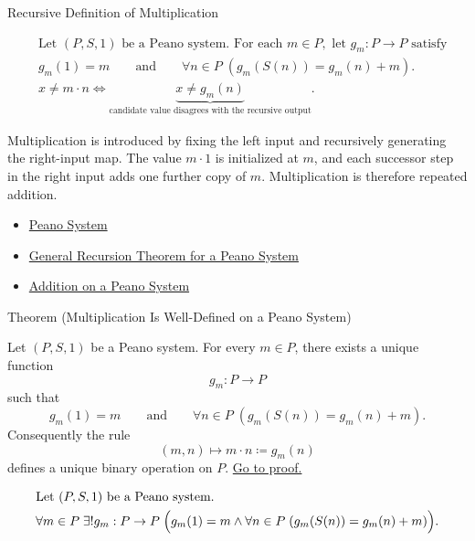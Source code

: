 \begin{topicbox}{Recursive Definition of Multiplication}
\begin{remark*}
\[
\begin{aligned}
&\text{Let } (P,S,1) \text{ be a Peano system. For each } m \in P,
\text{ let } g_m : P \to P \text{ satisfy}\\
&g_m(1)=m
\qquad\text{and}\qquad
\forall n \in P\;(g_m(S(n))=g_m(n)+m).\\
&x \neq m \cdot n
\Longleftrightarrow
\underbrace{x \neq g_m(n)}_{\text{candidate value disagrees with the recursive output}}.
\end{aligned}
\]
\end{remark*}

\begin{remark*}[Interpretation]
Multiplication is introduced by fixing the left input and recursively
generating the right-input map. The value $m \cdot 1$ is initialized at $m$,
and each successor step in the right input adds one further copy of $m$.
Multiplication is therefore repeated addition.
\end{remark*}

\begin{dependencies}
\begin{itemize}
  \item \hyperref[def:peano-system]{Peano System}
  \item \hyperref[thm:general-recursion-theorem-for-peano-system]{General Recursion Theorem for a Peano System}
  \item \hyperref[def:addition-on-peano-system]{Addition on a Peano System}
\end{itemize}
\end{dependencies}

\begin{theorembox}{Theorem (Multiplication Is Well-Defined on a Peano System)}
\begin{theorem}
\label{thm:multiplication-well-defined-on-peano-system}
Let $(P,S,1)$ be a Peano system. For every $m \in P$, there exists a unique
function
\[
g_m : P \to P
\]
such that
\[
g_m(1)=m
\qquad\text{and}\qquad
\forall n \in P\;(g_m(S(n))=g_m(n)+m).
\]
Consequently the rule
\[
(m,n) \longmapsto m \cdot n \coloneqq g_m(n)
\]
defines a unique binary operation on $P$.
\hyperref[prf:multiplication-well-defined-on-peano-system]{Go to proof.}
\end{theorem}
\end{theorembox}

\begin{remark*}
\[
\begin{aligned}
&\text{Let } (P,S,1) \text{ be a Peano system.}\\
&\forall m \in P\;\exists! g_m : P \to P\;
\Bigl(g_m(1)=m \land
\forall n \in P\;(g_m(S(n))=g_m(n)+m)\Bigr).
\end{aligned}
\]
\end{remark*}


\end{topicbox}
